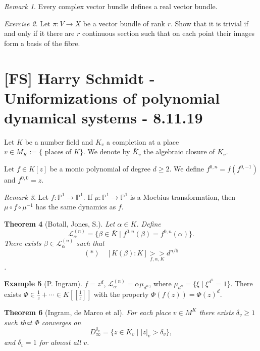 \documentclass[11pt,A4]{article}
\theoremstyle{plain}
\newtheorem{thm}{Theorem}[section]
\theoremstyle{definition}
\newtheorem{exa}[thm]{Example}
\theoremstyle{remark}
\newtheorem{rem}[thm]{Remark}
\newtheorem{exe}[thm]{Exercise}
\newcommand{\1}{\mathbbm{1}}
\renewcommand{\P}{\mathbb{P}}
\renewcommand{\L}{\mathcal{L}}
\begin{document}
\begin{rem}
    Every complex vector bundle defines a real vector bundle.
\end{rem}

\begin{exe}
    Let $\pi\colon V\to X$ be a vector bundle of rank $r$.
    Show that it is trivial if and only if it there are $r$ continuous section such that on each point their images form a basis of the fibre.
\end{exe}

\section{[FS] Harry Schmidt - Uniformizations of polynomial dynamical systems - 8.11.19}

Let $K$ be a number field and $K_{v}$ a completion at a place $v\in M_{K}:=\{ \text{ places of }K\}$.
We denote by $\bar{K}_{v}$ the algebraic closure of $K_{v}$.

Let $f\in K[z]$ be a monic polynomial of degree $d\geqslant 2$.
We define $f^{0,n}=f(f^{0,-1})$ and $f^{0,0}=z$.

\begin{rem}
    Let $f\colon \P^{1}\to \P^{1}$.
    If $\mu\colon \P^{1}\to \P^{1}$ is a Moebius transformation, then $\mu\circ f\circ \mu^{-1}$ has the same dynamics as $f$.
\end{rem}

\begin{thm}[Botall, Jones, S.]
    Let $\alpha\in K$.
    Define
    \[ \L_{\alpha}^{(n)}=\{ \beta\in \bar{K}\mid f^{0,n}(\beta)=f^{0,n}(\alpha)\}. \]
    There exists $\beta\in \L_{\alpha}^{(n)}$ such that
    \[ (*)\quad [K(\beta):K]\underset{f,\alpha,K}{>>}d^{n/5}\].
\end{thm}

\begin{exa}[P. Ingram]
    $f=z^{d}$, $\L_{\alpha}^{(n)}=\alpha\mu_{d^{n}}$, where $\mu_{d^{n}}=\{ \xi \mid \xi^{d^{n}}=1\}$.
    There exists $\Phi\in \frac{1}{z}+\cdots \in K[[\frac{1}{z}]]$ with the property $\Phi(f(z))=\Phi(z)^{d}$.
\end{exa}

\begin{thm}[Ingram, de Marco et al]
    For each place $v\in M^{K}$ there exists $\delta_{v}\geqslant 1$ such that $\Phi$ converges on
    \[ D_{\infty}^{\delta_{v}}=\{ z\in \bar{K}_{v}\mid |z|_{v}>\delta_{v}\},\]
    and $\delta_{v}=1$ for almost all $v$.
\end{thm}
\end{document}
